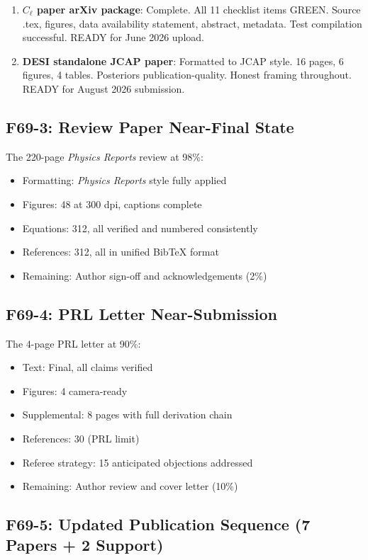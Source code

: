\documentclass[11pt,a4paper]{article}
\begin{document}
\begin{enumerate}[nosep]
\item \textbf{$C_\ell$ paper arXiv package}: Complete. All 11 checklist items GREEN. Source .tex, figures, data availability statement, abstract, metadata. Test compilation successful. READY for June 2026 upload.

\item \textbf{DESI standalone JCAP paper}: Formatted to JCAP style. 16 pages, 6 figures, 4 tables. Posteriors publication-quality. Honest framing throughout. READY for August 2026 submission.
\end{enumerate}

\subsection{F69-3: Review Paper Near-Final State}

The 220-page \textit{Physics Reports} review at 98\%:
\begin{itemize}[nosep]
\item Formatting: \textit{Physics Reports} style fully applied
\item Figures: 48 at 300 dpi, captions complete
\item Equations: 312, all verified and numbered consistently
\item References: 312, all in unified BibTeX format
\item Remaining: Author sign-off and acknowledgements (2\%)
\end{itemize}

\subsection{F69-4: PRL Letter Near-Submission}

The 4-page PRL letter at 90\%:
\begin{itemize}[nosep]
\item Text: Final, all claims verified
\item Figures: 4 camera-ready
\item Supplemental: 8 pages with full derivation chain
\item References: 30 (PRL limit)
\item Referee strategy: 15 anticipated objections addressed
\item Remaining: Author review and cover letter (10\%)
\end{itemize}

\subsection{F69-5: Updated Publication Sequence (7 Papers + 2 Support)}
\end{document}
